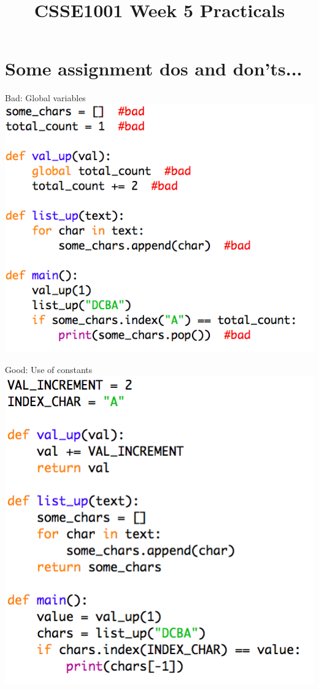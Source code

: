 \documentclass[week2]{csse1001}
\title{CSSE1001 Week 5 Practicals}
\begin{document}
\begin{frame} 
\maketitle
\end{frame}

\section{Some assignment dos and don'ts...}

\begin{topic}{Bad: Global variables}
\includegraphics[height=0.9\textheight]{bad_python/globals}
\end{topic}

\begin{topic}{Good: Use of constants}
\includegraphics[height=0.9\textheight]{bad_python/constants}
\end{topic}
\end{document}
